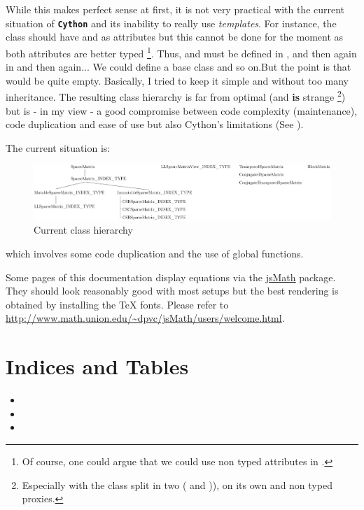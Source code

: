 \documentclass[letterpaper,10pt,english]{sphinxmanual}
\begin{document}
While this makes perfect sense at first, it is not very practical with the current situation of \textbf{\texttt{Cython}} and its inability to really use \emph{templates}. For instance, the  class should have
 and  as attributes but this cannot be done for the moment as both attributes are better typed \footnote{
Of course, one could argue that we could use non typed attributes in .
}. Thus,  and  must be defined in , and then
again in  and then again... We could define a base  class and so on.But the point is that  would be quite empty. Basically, I tried to keep it simple and
without too many inheritance. The resulting class hierarchy is far from optimal (and \textbf{is} strange \footnote{
Especially with the  class split in two ( and )),  on its own and
non typed proxies.
}) but is - in my view - a good compromise between code complexity (maintenance), code
duplication and ease of use but also Cython's limitations (See \footnotemark[1]).

The current situation is:
\begin{figure}[htbp]
\centering
\capstart

\includegraphics[width=700pt]{current_class_hierarchy.pdf}
\caption{Current class hierarchy}\end{figure}

which involves some code duplication and the use of global functions.

Some pages of this documentation display equations via the \href{http://www.math.union.edu/~dpvc/jsMath/welcome.html}{jsMath} package. They should
look reasonably good with most setups but the best rendering is obtained by
installing the TeX fonts. Please refer to
\href{http://www.math.union.edu/~dpvc/jsMath/users/welcome.html}{http://www.math.union.edu/\textasciitilde{}dpvc/jsMath/users/welcome.html}.


\chapter{Indices and Tables}
\label{contents:indices-and-tables}\begin{itemize}
\item {} 

\item {} 

\item {} 

\end{itemize}



\renewcommand{\indexname}{Index}
\printindex
\end{document}
